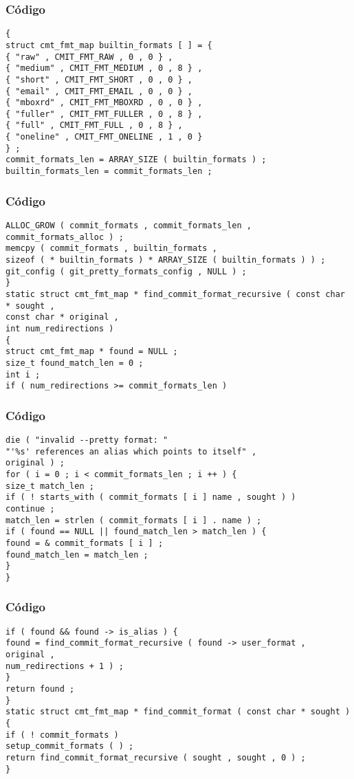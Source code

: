 \documentclass{beamer}
\begin{document}
\begin{frame}[fragile]
\frametitle{C\'odigo}
\begin{verbatim}
{ 
struct cmt_fmt_map builtin_formats [ ] = { 
{ "raw" , CMIT_FMT_RAW , 0 , 0 } , 
{ "medium" , CMIT_FMT_MEDIUM , 0 , 8 } , 
{ "short" , CMIT_FMT_SHORT , 0 , 0 } , 
{ "email" , CMIT_FMT_EMAIL , 0 , 0 } , 
{ "mboxrd" , CMIT_FMT_MBOXRD , 0 , 0 } , 
{ "fuller" , CMIT_FMT_FULLER , 0 , 8 } , 
{ "full" , CMIT_FMT_FULL , 0 , 8 } , 
{ "oneline" , CMIT_FMT_ONELINE , 1 , 0 } 
} ; 
commit_formats_len = ARRAY_SIZE ( builtin_formats ) ; 
builtin_formats_len = commit_formats_len ; 
\end{verbatim}
\end{frame}
\begin{frame}[fragile]
\frametitle{C\'odigo}
\begin{verbatim}
ALLOC_GROW ( commit_formats , commit_formats_len , commit_formats_alloc ) ; 
memcpy ( commit_formats , builtin_formats , 
sizeof ( * builtin_formats ) * ARRAY_SIZE ( builtin_formats ) ) ; 
git_config ( git_pretty_formats_config , NULL ) ; 
} 
static struct cmt_fmt_map * find_commit_format_recursive ( const char * sought , 
const char * original , 
int num_redirections ) 
{ 
struct cmt_fmt_map * found = NULL ; 
size_t found_match_len = 0 ; 
int i ; 
if ( num_redirections >= commit_formats_len ) 
\end{verbatim}
\end{frame}
\begin{frame}[fragile]
\frametitle{C\'odigo}
\begin{verbatim}
die ( "invalid --pretty format: " 
"'%s' references an alias which points to itself" , 
original ) ; 
for ( i = 0 ; i < commit_formats_len ; i ++ ) { 
size_t match_len ; 
if ( ! starts_with ( commit_formats [ i ] name , sought ) ) 
continue ; 
match_len = strlen ( commit_formats [ i ] . name ) ; 
if ( found == NULL || found_match_len > match_len ) { 
found = & commit_formats [ i ] ; 
found_match_len = match_len ; 
} 
} 
\end{verbatim}
\end{frame}
\begin{frame}[fragile]
\frametitle{C\'odigo}
\begin{verbatim}
if ( found && found -> is_alias ) { 
found = find_commit_format_recursive ( found -> user_format , 
original , 
num_redirections + 1 ) ; 
} 
return found ; 
} 
static struct cmt_fmt_map * find_commit_format ( const char * sought ) 
{ 
if ( ! commit_formats ) 
setup_commit_formats ( ) ; 
return find_commit_format_recursive ( sought , sought , 0 ) ; 
} 
\end{verbatim}
\end{frame}
\end{document}
